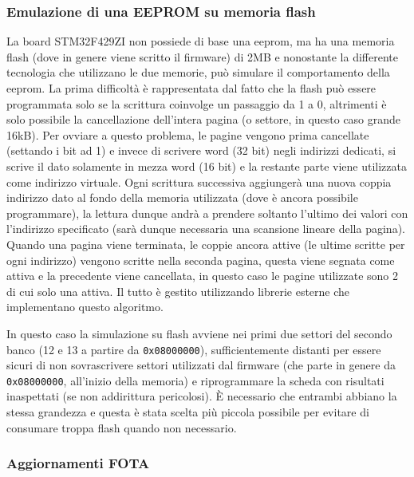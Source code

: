 \subsubsection{Emulazione di una EEPROM su memoria flash}

La board STM32F429ZI non possiede di base una eeprom, ma ha una memoria flash (dove in genere viene scritto il firmware) di 2MB e nonostante la differente tecnologia che utilizzano le due memorie, pu\`o simulare il comportamento della eeprom. La prima difficolt\`a \`e rappresentata dal fatto che la flash pu\`o essere programmata solo se la scrittura coinvolge un passaggio da 1 a 0, altrimenti \`e solo possibile la cancellazione dell'intera pagina (o settore, in questo caso grande 16kB). Per ovviare a questo problema, le pagine vengono prima cancellate (settando i bit ad 1) e invece di scrivere word (32 bit) negli indirizzi dedicati, si scrive il dato solamente in mezza word (16 bit) e la restante parte viene utilizzata come indirizzo virtuale. Ogni scrittura successiva aggiunger\`a una nuova coppia indirizzo dato al fondo della memoria utilizzata (dove \`e ancora possibile programmare), la lettura dunque andr\`a a prendere soltanto l'ultimo dei valori con l'indirizzo specificato (sar\`a dunque necessaria una scansione lineare della pagina). Quando una pagina viene terminata, le coppie ancora attive (le ultime scritte per ogni indirizzo) vengono scritte nella seconda pagina, questa viene segnata come attiva e la precedente viene cancellata, in questo caso le pagine utilizzate sono 2 di cui solo una attiva. Il tutto \`e gestito utilizzando librerie esterne che implementano questo algoritmo.

In questo caso la simulazione su flash avviene nei primi due settori del secondo banco (12 e 13 a partire da \texttt{0x08000000}), sufficientemente distanti per essere sicuri di non sovrascrivere settori utilizzati dal firmware (che parte in genere da \texttt{0x08000000}, all'inizio della memoria) e riprogrammare la scheda con risultati inaspettati (se non addirittura pericolosi). \`E necessario che entrambi abbiano la stessa grandezza e questa \`e stata scelta pi\`u piccola possibile per evitare di consumare troppa flash quando non necessario.

\subsubsection{Aggiornamenti FOTA}

